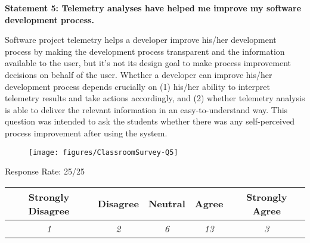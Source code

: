 

\newpage
\textbf{Statement 5: Telemetry analyses have helped me improve my software development process.}

Software project telemetry helps a developer improve his/her development process by making the development process transparent and the information available to the user, but it's not its design goal to make process improvement decisions on behalf of the user. Whether a developer can improve his/her development process depends crucially on (1) his/her ability to interpret telemetry results and take actions accordingly, and (2) whether telemetry analysis is able to deliver the relevant information in an easy-to-understand way. This question was intended to ask the students whether there was any self-perceived process improvement after using the system.

\begin{quote}\end{quote} %

\begin{figure}[h]
  \center
  \texttt{[image: figures/ClassroomSurvey-Q5]}
  \label{fig:InClassSurvey-Q5}
\end{figure}

\begin{center}Response Rate: 25/25\end{center}
\begin{table}[h]
	\centering
		\begin{tabular}{|c|c|c|c|c|} 
			\hline
			\textbf{Strongly Disagree} & \textbf{Disagree} & \textbf{Neutral} & \textbf{Agree} & \textbf{Strongly Agree} \\
			\hline
			\textit{1} & \textit{2} & \textit{6} & \textit{13} &\textit{3} \\
			\hline
		\end{tabular}
	\label{table:InClassSurvey-Q5}
\end{table}

%


